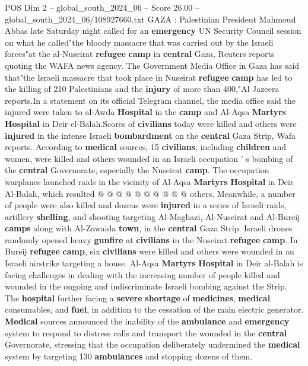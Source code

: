 \begin{textsample}{POS Dim 2 – global\_south\_2024\_06 – Score 26.00 – global\_south\_2024\_06/108927660.txt}  \label{ex:f2_pos_058}
GAZA : Palestinian President Mahmoud Abbas late Saturday night called for an \textbf{emergency} UN Security Council session on what he called"the bloody massacre that was carried out by the Israeli forces"at the al-Nuseirat \textbf{refugee} \textbf{camp} in \textbf{central} Gaza, Reuters reports quoting the WAFA news agency.
The Government Media Office in Gaza has said that"the Israeli massacre that took place in Nuseirat \textbf{refugee} \textbf{camp} has led to the killing of 210 Palestinians and the \textbf{injury} of more than 400,"Al Jazeera reports.In a statement on its official Telegram channel, the media office said the injured were taken to al-Awda \textbf{Hospital} in the \textbf{camp} and Al-Aqsa \textbf{Martyrs} \textbf{Hospital} in Deir el-Balah.Scores of \textbf{civilians} today were killed and others were \textbf{injured} in the intense Israeli \textbf{bombardment} on the \textbf{central} Gaza Strip, Wafa reports.
According to \textbf{medical} sources, 15 \textbf{civilians}, including \textbf{children} and women, were killed and others wounded in an Israeli occupation ' s bombing of the \textbf{central} Governorate, especially the Nuseirat \textbf{camp}.
The occupation warplanes launched raids in the vicinity of Al-Aqsa \textbf{Martyrs} \textbf{Hospital} in Deir Al-Balah, which resulted @ @ @ @ @ @ @ @ @ @ others.
Meanwhile, a number of people were also killed and dozens were \textbf{injured} in a series of Israeli raids, artillery \textbf{shelling}, and shooting targeting Al-Maghazi, Al-Nuseirat and Al-Bureij \textbf{camps} along with Al-Zawaida \textbf{town}, in the \textbf{central} Gaza Strip.
Israeli drones randomly opened heavy \textbf{gunfire} at \textbf{civilians} in the Nuseirat \textbf{refugee} \textbf{camp}.
In Bureij \textbf{refugee} \textbf{camp}, six \textbf{civilians} were killed and others were wounded in an Israeli airstrike targeting a house.
Al-Aqsa \textbf{Martyrs} \textbf{Hospital} in Deir al-Balah is facing challenges in dealing with the increasing number of people killed and wounded in the ongoing and indiscriminate Israeli bombing against the Strip.
The \textbf{hospital} further facing a \textbf{severe} \textbf{shortage} of \textbf{medicines}, \textbf{medical} consumables, and \textbf{fuel}, in addition to the cessation of the main electric generator. \textbf{Medical} sources announced the inability of the \textbf{ambulance} and \textbf{emergency} system to respond to distress calls and transport the wounded in the \textbf{central} Governorate, stressing that the occupation deliberately undermined the \textbf{medical} system by targeting 130 \textbf{ambulances} and stopping dozens of them.

\end{textsample}

